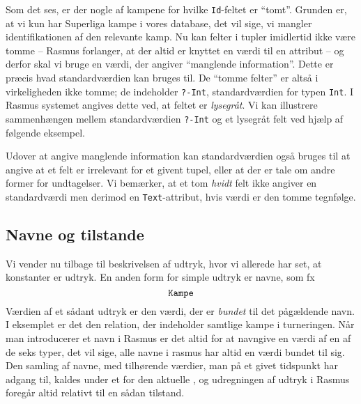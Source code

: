 Som det ses, er der nogle af kampene for hvilke \verb"Id"-feltet
er ``tomt''. Grunden er, at vi kun har Superliga kampe i vores
database, det vil sige, vi mangler identifikationen af den relevante
kamp. Nu kan felter i tupler imidlertid ikke v\ae{}re tomme --
{\sc Rasmus} forlanger, at der altid er knyttet en v\ae{}rdi til
en attribut -- og derfor skal vi bruge en v\ae{}rdi, der angiver
``manglende information''. Dette er pr\ae{}cis hvad standardv\ae{}rdien
kan bruges til. De ``tomme felter'' er alts\aa{} i virkeligheden ikke
tomme; de indeholder \verb"?-Int", standardv\ae{}rdien for typen \verb"Int".
I {\sc Rasmus} systemet angives dette ved, at feltet er {\em lysegr\aa{}t}.
Vi kan illustrere sammenh\ae{}ngen mellem standardv\ae{}rdien
\verb"?-Int" og et lysegr\aa{}t felt ved hj\ae{}lp af f\o{}lgende eksempel.


Udover at angive manglende information kan standardv\ae{}rdien
ogs\aa{} brug\-es til at angive at et felt er irrelevant for et
givent tupel, eller at der er tale om andre former for undtagelser.
Vi bem\ae{}rker, at et tom {\em hvidt\/} felt ikke angiver en
standardv\ae{}rdi men derimod en \verb"Text"-attribut, hvis v\ae{}rdi
er den tomme tegnf\o{}lge.

\subsection{Navne og tilstande}
Vi vender nu tilbage til beskrivelsen af udtryk, hvor vi allerede har
set, at konstanter er udtryk. En anden form for simple udtryk er navne,
som fx
$$ \mbox{\tt Kampe} $$
V\ae{}rdien af et s\aa{}dant udtryk er den v\ae{}rdi, der er {\em bundet\/}
til det p\aa{}\-g\ae{}ld\-en\-de navn. I eksemplet er det den relation,
der indeholder samtlige kampe i turneringen. N\aa{}r man introducerer et
navn i {\sc Rasmus} er det altid for at navngive en v\ae{}rdi af en af
de seks typer, det vil sige, alle navne i {\sc rasmus} har altid
en v\ae{}rdi bundet til sig. Den samling af navne, med tilh\o{}rende
v\ae{}rdier, man p\aa{} et givet tidspunkt har adgang til, kaldes
under et for den aktuelle {\em {}}, og udregningen af udtryk i
{\sc Rasmus} foreg\aa{}r altid relativt til en s\aa{}dan tilstand.

